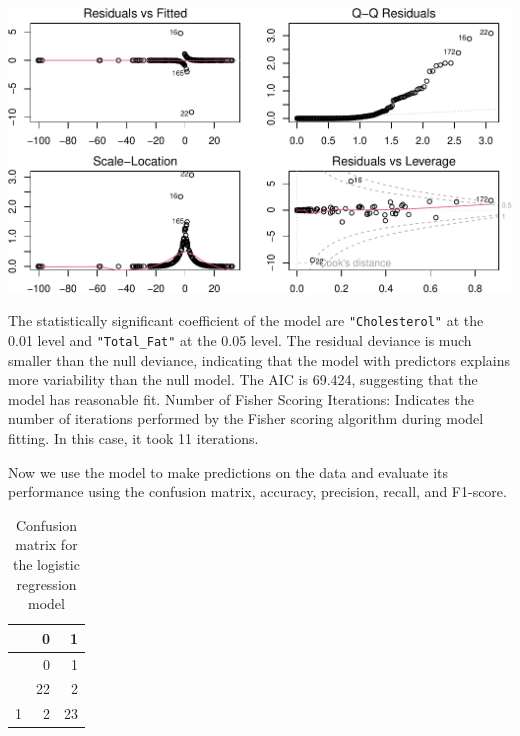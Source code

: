 \documentclass[
]{article}
\newenvironment{Shaded}{\begin{snugshade}}{\end{snugshade}}
\newcommand{\AttributeTok}[1]{\textcolor[rgb]{0.13,0.29,0.53}{#1}}
\newcommand{\FunctionTok}[1]{\textcolor[rgb]{0.13,0.29,0.53}{\textbf{#1}}}
\newcommand{\NormalTok}[1]{#1}
\newcommand{\OtherTok}[1]{\textcolor[rgb]{0.56,0.35,0.01}{#1}}
\newcommand{\SpecialCharTok}[1]{\textcolor[rgb]{0.81,0.36,0.00}{\textbf{#1}}}
\newcommand{\StringTok}[1]{\textcolor[rgb]{0.31,0.60,0.02}{#1}}
\begin{document}
\begin{center}\includegraphics{Statistical_Learning_Final_Report_files/figure-latex/logistic_regression-1} \end{center}

The statistically significant coefficient of the model are
\texttt{"Cholesterol"} at the 0.01 level and \texttt{"Total\_Fat"} at
the 0.05 level. The residual deviance is much smaller than the null
deviance, indicating that the model with predictors explains more
variability than the null model. The AIC is 69.424, suggesting that the
model has reasonable fit. Number of Fisher Scoring Iterations: Indicates
the number of iterations performed by the Fisher scoring algorithm
during model fitting. In this case, it took 11 iterations.

Now we use the model to make predictions on the data and evaluate its
performance using the confusion matrix, accuracy, precision, recall, and
F1-score.

\begin{Shaded}
\end{Shaded}

\begin{longtable}[]{@{}lrr@{}}
\caption{Confusion matrix for the logistic regression
model}\tabularnewline
\toprule\noalign{}
& 0 & 1 \\
\midrule\noalign{}
\endfirsthead
\toprule\noalign{}
& 0 & 1 \\
\midrule\noalign{}
\endhead
\bottomrule\noalign{}
\endlastfoot
0 & 22 & 2 \\
1 & 2 & 23 \\
\end{longtable}
\end{document}
